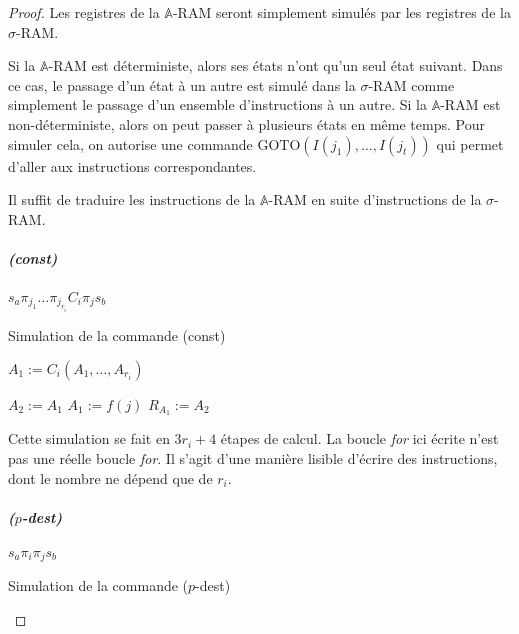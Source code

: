 \documentclass{report}
\newcommand{\bbA}{\mathbb{A}}
\begin{document}
				\begin{proof}
					Les registres de la $\bbA$-RAM seront simplement simulés par les registres de la $\sigma$-RAM. 
					
					Si la $\bbA$-RAM est déterministe, alors ses états n'ont qu'un seul état suivant. Dans ce cas, le passage d'un état à un autre est simulé dans la $\sigma$-RAM comme simplement le passage d'un ensemble d'instructions à un autre. Si la $\bbA$-RAM est non-déterministe, alors on peut passer à plusieurs états en même temps. Pour simuler cela, on autorise une commande $\text{GOTO}(I(j_1), \dots, I(j_t))$ qui permet d'aller aux instructions correspondantes. 
					
					Il suffit de traduire les instructions de la $\bbA$-RAM en suite d'instructions de la $\sigma$-RAM.
					
					\subparagraph{(const)}
					$s_a \pi_{j_1} \dots \pi_{j_{r_i}} C_i \pi_j s_b$
					
					
					
					
					\begin{algorithm}[H]
						\caption{Simulation de la commande (const)}
						
						
						
							
						
						$A_1 := C_i (A_1, \dots, A_{r_i})$\;
						
						
						$A_2 := A_1$\;
						$A_1 := f(j)$\;
						$R_{A_1} := A_2$\;
					\end{algorithm}
					
					\espace
					
					Cette simulation se fait en $3r_i + 4$ étapes de calcul. La boucle \emph{for} ici écrite n'est pas une réelle boucle \emph{for}. Il s'agit d'une manière lisible d'écrire des instructions, dont le nombre ne dépend que de $r_i$.

					
					\subparagraph{($p$-dest)}
					$s_a \pi_i \pi_j s_b$
					
					\begin{algorithm}[H]
						\caption{Simulation de la commande ($p$-dest)}
						

\end{algorithm}
\end{proof}
\end{document}
